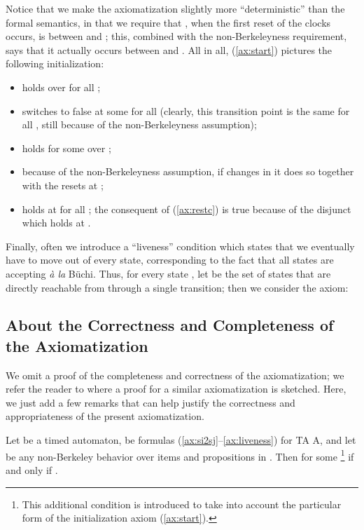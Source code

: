 \documentclass[a4paper]{article}
\newcommand{\frf}[1]{(\ref{#1})}
\newcommand{\fsrf}[2]{(\ref{#1}--\ref{#2})}
\theoremstyle{plain}
\theoremstyle{definition}
\begin{document}
Notice that we make the axiomatization slightly more ``deterministic'' than the formal semantics, in that we require that , when the first reset of the clocks occurs, is between  and ; this, combined with the non-Berkeleyness requirement, says that it actually occurs between  and .
All in all, \frf{ax:start} pictures the following initialization:
\begin{itemize}
  \item  holds over  for all ;
  \item  switches to false at some  for all  (clearly, this transition point is the same for all , still because of the non-Berkeleyness assumption);
  \item  holds for some  over ;
  \item because of the non-Berkeleyness assumption, if  changes in  it does so together with the resets at ;
  \item  holds at  for all ; the consequent of \frf{ax:restc} is true because of the disjunct  which holds at .
\end{itemize}


Finally, often we introduce a ``liveness'' condition which states that we eventually have to move out of every state, corresponding to the fact that all states are accepting \emph{\`a la} B\"uchi.
Thus, for every state , let  be the set of states that are directly reachable from  through a single transition; then we consider the axiom:







 \subsection{About the Correctness and Completeness of the Axiomatization}
 We omit a proof of the completeness and correctness of the axiomatization; we refer the reader to \cite[App.~D.6]{Fur07} where a proof for a similar axiomatization is sketched.
Here, we just add a few remarks that can help justify the correctness and appropriateness of the present axiomatization.

\begin{proposition}
Let  be a timed automaton,  be formulas \fsrf{ax:si2sj}{ax:liveness} for TA A, and let  be any non-Berkeley behavior over items  and propositions in .
Then  for some \footnote{This additional condition is introduced to take into account the particular form of the initialization axiom \frf{ax:start}.} if and only if .
\end{proposition}
\end{document}

